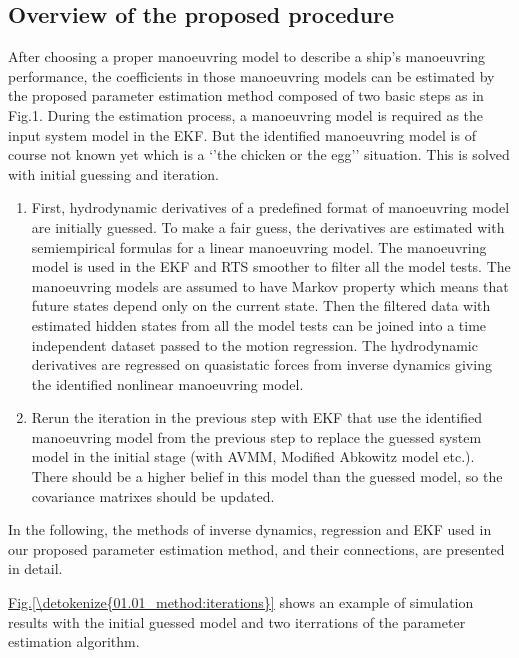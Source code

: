 \documentclass[review]{elsarticle}
\begin{document}
\subsection{Overview of the proposed procedure}
\label{\detokenize{01.01_method:overview-of-the-proposed-procedure}}
\sphinxAtStartPar
After choosing a proper manoeuvring model to describe a ship’s manoeuvring performance, the coefficients in those manoeuvring models can be estimated by the proposed parameter estimation method composed of two basic steps as in Fig.1. During the estimation process, a manoeuvring model is required as the input system model in the EKF. But the identified manoeuvring model is of course not known yet which is a ‘’the chicken or the egg’’ situation. This is solved with initial guessing and iteration.
\begin{enumerate}
%
\item {} 
\sphinxAtStartPar
First, hydrodynamic derivatives of a pre\sphinxhyphen{}defined format of manoeuvring model are initially guessed. To make a fair guess, the derivatives are estimated with semi\sphinxhyphen{}empirical formulas for a linear manoeuvring model. The manoeuvring model is used in the EKF and RTS smoother to filter all the model tests. The manoeuvring models are assumed to have Markov property which means that future states depend only on the current state. Then the filtered data with estimated hidden states from all the model tests can be joined into a time independent dataset passed to the motion regression. The hydrodynamic derivatives are regressed on quasi\sphinxhyphen{}static forces from inverse dynamics giving the identified nonlinear manoeuvring model.

\item {} 
\sphinxAtStartPar
Re\sphinxhyphen{}run the iteration in the previous step with EKF that use the identified manoeuvring model from the previous step to replace the guessed system model in the initial stage (with AVMM, Modified Abkowitz model etc.). There should be a higher belief in this model than the guessed model, so the covariance matrixes should be updated.

\end{enumerate}

\sphinxAtStartPar
In the following, the methods of inverse dynamics, regression and EKF used in our proposed parameter estimation method, and their connections, are presented in detail.

\sphinxAtStartPar
\hyperref[\detokenize{01.01_method:iterations}]{Fig.\@ \ref{\detokenize{01.01_method:iterations}}} shows an example of simulation results with the initial guessed model and two iterrations of the parameter estimation algorithm.
\end{document}
